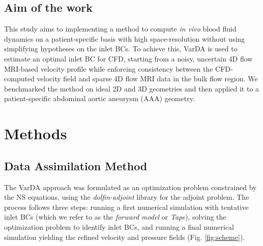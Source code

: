 \subsection*{Aim of the work}
This study aims to implementing a method to compute \textit{in vivo} blood fluid dynamics on a patient-specific basis with high space-resolution without using simplifying hypotheses on the inlet BCs. To achieve this, VarDA is used to estimate an optimal inlet BC for CFD, starting from a noisy, uncertain 4D flow MRI-based velocity profile while enforcing consistency between the CFD-computed velocity field and sparse 4D flow MRI data in the bulk flow region. We benchmarked the method on ideal 2D and 3D geometries and then applied it to a patient-specific abdominal aortic aneurysm (AAA) geometry. 

\section*{Methods}
\label{sec:methods}

\subsection*{Data Assimilation Method}
The VarDA approach was formulated as an optimization problem constrained by the NS equations, using the \emph{dolfin-adjoint} library for the adjoint problem. The process follows three steps: running a first numerical simulation with tentative inlet BCs (which we refer to as the \emph{forward model} or \emph{Tape}), solving the optimization problem to identify inlet BCs, and running a final numerical simulation yielding the refined velocity and pressure fields (Fig. \ref{fig:scheme}).

